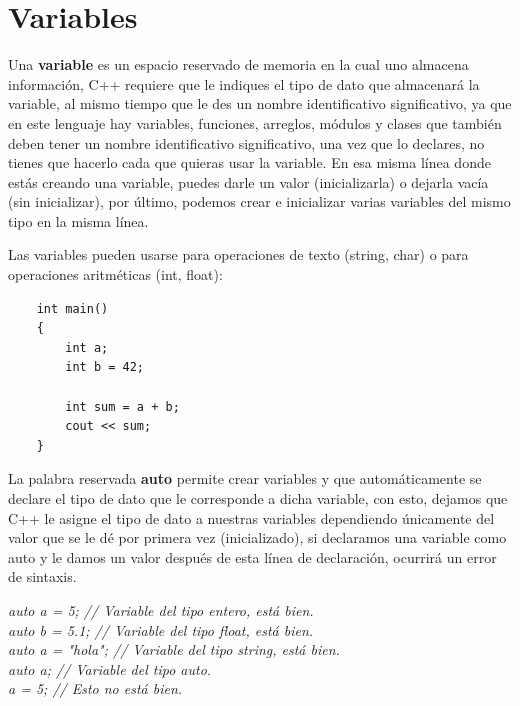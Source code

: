 \section{Variables}
\hspace{0.55cm}Una \textbf{variable} es un espacio reservado de memoria en la cual uno almacena información, C++ requiere que le indiques el tipo de dato que almacenará la variable, al mismo tiempo que le des un nombre identificativo significativo, ya que en este lenguaje hay variables, funciones, arreglos, módulos y clases que también deben tener un nombre identificativo significativo, una vez que lo declares, no tienes que hacerlo cada que quieras usar la variable. En esa misma línea donde estás creando una variable, puedes darle un valor (inicializarla) o dejarla vacía (sin inicializar), por último, podemos crear e inicializar varias variables del mismo tipo en la misma línea.

Las variables pueden usarse para operaciones de texto (string, char) o para operaciones aritméticas (int, float):
\begin{lstlisting}
    int main()
    {
        int a;
        int b = 42;
        
        int sum = a + b;
        cout << sum;
    }
\end{lstlisting}

La palabra reservada \textbf{auto} permite crear variables y que automáticamente se declare el tipo de dato que le corresponde a dicha variable, con esto, dejamos que C++ le asigne el tipo de dato a nuestras variables dependiendo únicamente del valor que se le dé por primera vez (inicializado), si declaramos una variable como auto y le damos un valor después de esta línea de declaración, ocurrirá un error de sintaxis.
\begin{center}
    \textit{
		auto a = 5; // Variable del tipo entero, está bien. \\
		auto b = 5.1; // Variable del tipo float, está bien. \\
		auto a = "hola"; // Variable del tipo string, está bien. \\
		auto a; // Variable del tipo auto. \\
		a = 5; // Esto no está bien.
    }
\end{center}


